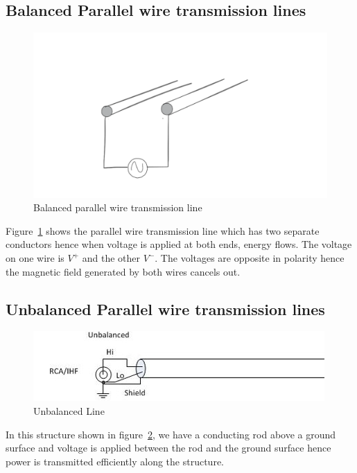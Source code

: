 \subsection{Balanced Parallel wire transmission lines}
\begin{figure}[h]
\centering
\includegraphics[width=1\linewidth]{./graphics/parallel_wire_tx_simp_temp}
\caption{Balanced parallel wire transmission line}
\label{fig:twowire}
\end{figure}

Figure~\ref{fig:twowire} shows the parallel wire transmission line which has two separate conductors hence when voltage is applied at both ends, energy flows. The voltage on one wire is $V^+$ and the other $V^-$. The voltages are opposite in polarity hence the magnetic field generated by both wires cancels out.

\subsection{Unbalanced Parallel wire transmission lines}
\begin{figure}[h]
\centering
\includegraphics[width=1\linewidth]{./graphics/unbalanced}
\caption{Unbalanced Line}
\label{fig:unbalanced}
\end{figure}

In this structure shown in figure~\ref{fig:unbalanced}, we have a conducting rod above a ground surface and voltage is applied between the rod and the ground surface hence power is transmitted efficiently along the structure.

